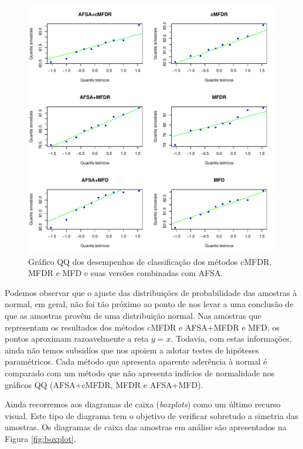 \documentclass[conference]{IEEEtran}
\begin{document}
\begin{figure}[!hb]
	\centering
	\includegraphics[width=\linewidth]{img/blueqqplots.pdf}
	\caption{Gráfico QQ dos desempenhos de classificação dos métodos cMFDR, MFDR e MFD e suas versões combinadas com AFSA.}
	\label{fig:qqplots}
\end{figure}

Podemos observar que o ajuste das distribuições de probabilidade das amostras à normal, em geral, não foi tão próximo ao ponto de nos levar a uma conclusão de que as amostras provêm de uma distribuição normal.
Nas amostras que representam os resultados dos métodos cMFDR e AFSA+MFDR e MFD, os pontos aproximam razoavelmente a reta $y = x$. Todavia, com estas informações, ainda não temos subsidíos que nos apoiem a adotar testes de hipóteses paramétricos. Cada método que apresenta aparente aderência à normal é comparado com um método que não apresenta indícios de normalidade nos gráficos QQ (AFSA+cMFDR, MFDR e AFSA+MFD). 

Ainda recorremos aos diagramas de caixa (\textit{boxplots}) como um último recurso visual. 
Este tipo de diagrama tem o objetivo de verificar sobretudo a simetria das amostras. Os diagramas de caixa das amostras em análise são apresentados na Figura \ref{fig:boxplot}.
\end{document}
